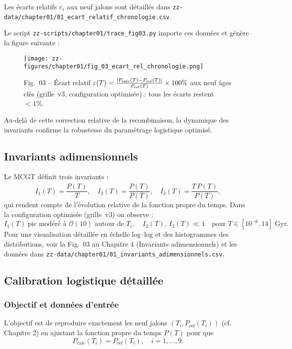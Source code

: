 Les écarts relatifs \(\varepsilon_i\) aux neuf jalons sont détaillés dans  
\texttt{zz-data/chapter01/01\_ecart\_relatif\_chronologie.csv}.  

Le script \texttt{zz-scripts/chapter01/trace\_fig03.py} importe ces données  
et génère la figure suivante :

\begin{figure}[htbp]
  \centering
  \texttt{[image: zz-figures/chapter01/fig\_03\_ecart\_rel\_chronologie.png]}
  \caption{Fig.~03 – Écart relatif  
    \(\varepsilon(T)
      =\frac{|P_{\rm calc}(T)-P_{\rm ref}(T)|}{P_{\rm ref}(T)}\times100\%\)
    aux neuf âges clés (grille~v3, configuration optimisée) : tous les écarts  
    restent \(<1\%\).}
  \label{fig:ecart_relatif_chronologie}
\end{figure}

Au-delà de cette correction relative de la recombinaison, la dynamique des invariants confirme la robustesse du paramétrage logistique optimisé.  

\subsection{Invariants adimensionnels}

Le MCGT définit trois invariants :
\[
  I_{1}(T)=\frac{P(T)}{T},\quad
  I_{2}(T)=\frac{\dot P(T)}{P(T)},\quad
  I_{3}(T)=\frac{T\,\dot P(T)}{P(T)},
\]
qui rendent compte de l’évolution relative de la fonction propre du temps.  
Dans la configuration optimisée (grille~v3) on observe :
\[
  I_{1}(T)\;\text{pic modéré à }\mathcal{O}(10)\text{ autour de }T_{c},
  \quad
  I_{2}(T),\,I_{3}(T)\ll1
  \quad
  \text{pour }T\in[10^{-6},14]\;\mathrm{Gyr}.
\]
Pour une visualisation détaillée en échelle log–log et des histogrammes des distributions, voir la Fig.~03 au Chapitre 4 (Invariants adimensionnels) et les données dans  
\texttt{zz-data/chapter01/01\_invariants_adimensionnels.csv}. 

\subsection{Calibration logistique détaillée}

\subsubsection{Objectif et données d’entrée}

L’objectif est de reproduire exactement les neuf jalons 
\((T_i,P_{\mathrm{ref}}(T_i))\) (cf. Chapitre 2) en ajustant la fonction propre  
du temps \(P(T)\) pour que
\[
  P_{\mathrm{calc}}(T_{i}) = P_{\mathrm{ref}}(T_{i}), 
  \quad i=1,\dots,9.
\]

